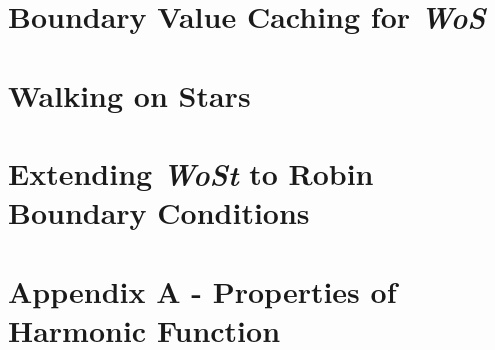 \documentclass[10pt]{article}
\begin{document}
\section{Boundary Value Caching for \emph{WoS} \cite{BVCWoS}}

\section{Walking on Stars \cite{WalkOnStars}}

\section{Extending \emph{WoSt} to Robin Boundary Conditions\cite{WalkinRobin}}

\printbibliography

\section{Appendix A - Properties of Harmonic Function}
\end{document}
